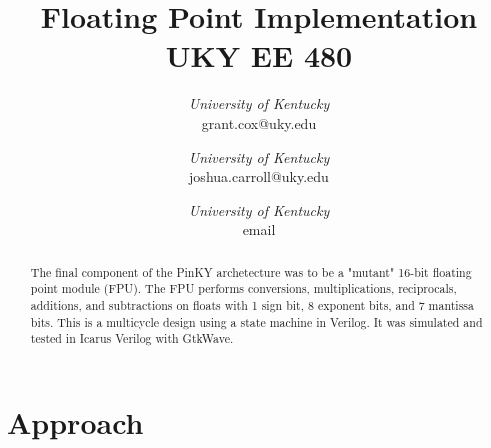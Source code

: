 \documentclass[conference]{IEEEtran}
\begin{document}
\title{Floating Point Implementation\\
    UKY EE 480}

\author{
\textit{University of Kentucky}\\
grant.cox@uky.edu
\and
{}
\textit{University of Kentucky}\\
joshua.carroll@uky.edu
\and
{}
\textit{University of Kentucky}\\
email}

\maketitle




\begin{abstract}
    The final component of the PinKY archetecture was to be a "mutant" 16-bit floating point module (FPU). The FPU performs conversions, multiplications, reciprocals, additions, and subtractions on floats with 1 sign bit, 8 exponent bits, and 7 mantissa bits. This is a multicycle design using a state machine in Verilog. It was simulated and tested in Icarus Verilog with GtkWave.
\end{abstract}

\section{Approach}
\end{document}
